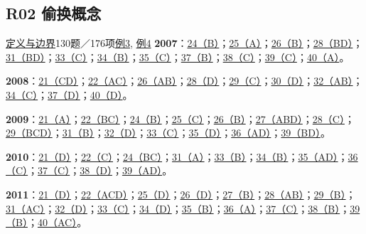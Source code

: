 \documentclass[11pt,a4paper]{article}
\begin{document}
\subsection{R02 偷换概念}\label{class-R02}
\noindent \hyperref[cat-R02]{定义与边界}\quad 130题／176项\quad \hyperref[case-2007-T4-Q39]{例3}, \hyperref[case-2016-T3-Q34]{例4}
\noindent\textbf{2007}：\hyperref[idx-2007-T1-Q24]{24（B）}；\hyperref[idx-2007-T1-Q25]{25（A）}；\hyperref[idx-2007-T2-Q26]{26（B）}；\hyperref[idx-2007-T2-Q28]{28（BD）}；\hyperref[idx-2007-T3-Q31]{31（BD）}；\hyperref[idx-2007-T3-Q33]{33（C）}；\hyperref[idx-2007-T3-Q34]{34（B）}；\hyperref[idx-2007-T3-Q35]{35（C）}；\hyperref[idx-2007-T4-Q37]{37（B）}；\hyperref[idx-2007-T4-Q38]{38（C）}；\hyperref[idx-2007-T4-Q39]{39（C）}；\hyperref[idx-2007-T4-Q40]{40（A）}。\par
\noindent\textbf{2008}：\hyperref[idx-2008-T1-Q21]{21（CD）}；\hyperref[idx-2008-T1-Q22]{22（AC）}；\hyperref[idx-2008-T2-Q26]{26（AB）}；\hyperref[idx-2008-T2-Q28]{28（D）}；\hyperref[idx-2008-T2-Q29]{29（C）}；\hyperref[idx-2008-T2-Q30]{30（D）}；\hyperref[idx-2008-T3-Q32]{32（AB）}；\hyperref[idx-2008-T3-Q34]{34（C）}；\hyperref[idx-2008-T4-Q37]{37（D）}；\hyperref[idx-2008-T4-Q40]{40（D）}。\par
\noindent\textbf{2009}：\hyperref[idx-2009-T1-Q21]{21（A）}；\hyperref[idx-2009-T1-Q22]{22（BC）}；\hyperref[idx-2009-T1-Q24]{24（B）}；\hyperref[idx-2009-T1-Q25]{25（C）}；\hyperref[idx-2009-T2-Q26]{26（B）}；\hyperref[idx-2009-T2-Q27]{27（ABD）}；\hyperref[idx-2009-T2-Q28]{28（C）}；\hyperref[idx-2009-T2-Q29]{29（BCD）}；\hyperref[idx-2009-T3-Q31]{31（B）}；\hyperref[idx-2009-T3-Q32]{32（D）}；\hyperref[idx-2009-T3-Q33]{33（C）}；\hyperref[idx-2009-T3-Q35]{35（D）}；\hyperref[idx-2009-T4-Q36]{36（AD）}；\hyperref[idx-2009-T4-Q39]{39（BD）}。\par
\noindent\textbf{2010}：\hyperref[idx-2010-T1-Q21]{21（D）}；\hyperref[idx-2010-T1-Q22]{22（C）}；\hyperref[idx-2010-T1-Q24]{24（BC）}；\hyperref[idx-2010-T3-Q31]{31（A）}；\hyperref[idx-2010-T3-Q33]{33（B）}；\hyperref[idx-2010-T3-Q34]{34（B）}；\hyperref[idx-2010-T3-Q35]{35（AD）}；\hyperref[idx-2010-T4-Q36]{36（C）}；\hyperref[idx-2010-T4-Q37]{37（C）}；\hyperref[idx-2010-T4-Q38]{38（D）}；\hyperref[idx-2010-T4-Q39]{39（AD）}。\par
\noindent\textbf{2011}：\hyperref[idx-2011-T1-Q21]{21（D）}；\hyperref[idx-2011-T1-Q22]{22（ACD）}；\hyperref[idx-2011-T1-Q25]{25（D）}；\hyperref[idx-2011-T2-Q26]{26（D）}；\hyperref[idx-2011-T2-Q27]{27（B）}；\hyperref[idx-2011-T2-Q28]{28（AB）}；\hyperref[idx-2011-T2-Q29]{29（B）}；\hyperref[idx-2011-T3-Q31]{31（AC）}；\hyperref[idx-2011-T3-Q32]{32（D）}；\hyperref[idx-2011-T3-Q33]{33（C）}；\hyperref[idx-2011-T3-Q34]{34（D）}；\hyperref[idx-2011-T3-Q35]{35（B）}；\hyperref[idx-2011-T4-Q36]{36（A）}；\hyperref[idx-2011-T4-Q37]{37（C）}；\hyperref[idx-2011-T4-Q38]{38（B）}；\hyperref[idx-2011-T4-Q39]{39（B）}；\hyperref[idx-2011-T4-Q40]{40（AC）}。\par
\end{document}
